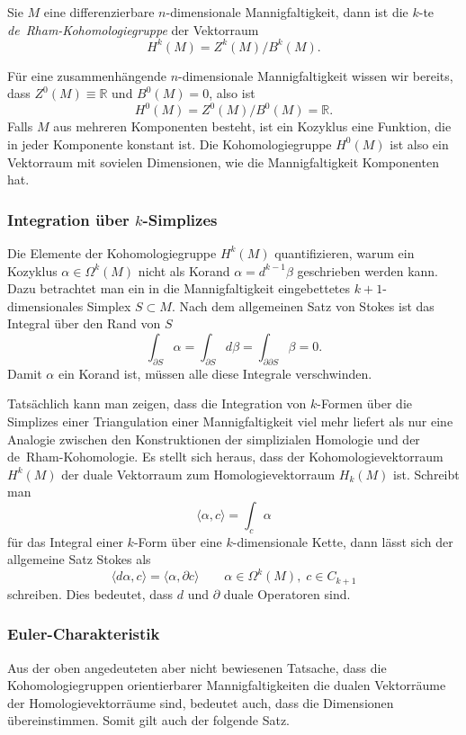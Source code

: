 \begin{definition}
Sie $M$ eine differenzierbare $n$-dimensionale Mannigfaltigkeit, dann
ist die $k$-te \emph{de~Rham-Kohomologiegruppe} der Vektorraum
%
\[
H^k(M)
=
Z^k(M) / B^k(M).
\]
\end{definition}

Für eine zusammenhängende $n$-dimensionale Mannigfaltigkeit wissen wir
bereits, dass $Z^0(M)\equiv\mathbb{R}$ und $B^0(M)=0$, also ist
\[
H^0(M) = Z^0(M) / B^0(M) = \mathbb{R}.
\]
Falls $M$ aus mehreren Komponenten besteht, ist ein Kozyklus eine
Funktion, die in jeder Komponente konstant ist.
Die Kohomologiegruppe $H^0(M)$ ist also ein Vektorraum mit sovielen
Dimensionen, wie die Mannigfaltigkeit Komponenten hat.

%
%
\subsubsection{Integration über $k$-Simplizes}
Die Elemente der Kohomologiegruppe $H^k(M)$ quantifizieren, warum
ein Kozyklus $\alpha\in \Omega^k(M)$ nicht als Korand $\alpha=d^{k-1}\beta$
geschrieben werden kann.
Dazu betrachtet man ein in die Mannigfaltigkeit eingebettetes
$k+1$-dimensionales Simplex $S\subset M$.
Nach dem allgemeinen Satz von Stokes ist das Integral über den Rand von
$S$
\[
\int_{\partial S} \alpha
=
\int_{\partial S} d\beta
=
\int_{\partial\partial S}\beta
=
0.
\]
Damit $\alpha$ ein Korand ist, müssen alle diese Integrale verschwinden.

Tatsächlich kann man zeigen, dass die Integration von $k$-Formen über
die Simplizes einer Triangulation einer Mannigfaltigkeit viel mehr
liefert als nur eine Analogie zwischen den Konstruktionen der
simplizialen Homologie und der de~Rham-Kohomologie.
Es stellt sich heraus, dass der Kohomologievektorraum $H^k(M)$
der duale Vektorraum zum Homologievektorraum $H_k(M)$ ist.
Schreibt man
\[
\langle \alpha, c \rangle
=
\int_c \alpha
\]
für das Integral einer $k$-Form über eine $k$-dimensionale Kette, dann
lässt sich der allgemeine Satz Stokes als
%
\[
\langle d\alpha, c\rangle
=
\langle \alpha,\partial c\rangle
\qquad
\alpha\in \Omega^k(M),\; c\in C_{k+1}
\]
schreiben.
Dies bedeutet, dass $d$ und $\partial$ duale Operatoren sind.

%
%
\subsubsection{Euler-Charakteristik}
Aus der oben angedeuteten aber nicht bewiesenen Tatsache, dass die
Kohomologiegruppen orientierbarer Mannigfaltigkeiten die dualen
Vektorräume der Homologievektorräume sind, bedeutet auch, dass die 
Dimensionen übereinstimmen.
Somit gilt auch der folgende Satz.

